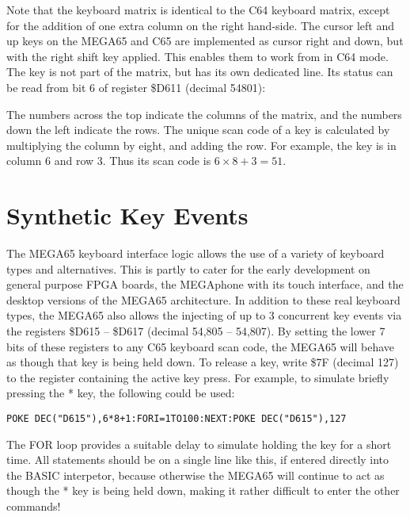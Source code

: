 Note that the keyboard matrix is identical to the C64 keyboard matrix, except for the addition of one extra column
on the right hand-side.  The cursor left and up keys on the MEGA65 and C65 are implemented as cursor right and down, but
with the right shift key applied.  This enables them to work from in C64 mode.  The  key is not
part of the matrix, but has its own dedicated line.  Its status can be read from bit 6 of register \$D611 (decimal 54801):

The numbers across the top indicate the columns of the matrix, and the numbers down the left indicate the rows.
The unique scan code of a key is calculated by multiplying the column by eight, and adding the row.  For example,
the  key is in column 6 and row 3. Thus its scan code is $6 \times 8 + 3 = 51$.

\section{Synthetic Key Events}

The MEGA65 keyboard interface logic allows the use of a variety of keyboard types and alternatives. This is partly
to cater for the early development on general purpose FPGA boards, the MEGAphone with its touch interface, and the
desktop versions of the MEGA65 architecture.  In addition to these real keyboard types, the MEGA65 also allows the
injecting of up to 3 concurrent key events via the registers \$D615 -- \$D617 (decimal 54,805 -- 54,807).  By setting the
lower 7 bits of these registers to any C65 keyboard scan code, the MEGA65 will behave as though that key is being
held down.  To release a key, write \$7F (decimal 127) to the register containing the active key press. For example,
to simulate briefly pressing the * key, the following could be used:

\begin{tcolorbox}[colback=black,coltext=white]
\verbatimfont{\codefont}
\begin{verbatim}
POKE DEC("D615"),6*8+1:FORI=1TO100:NEXT:POKE DEC("D615"),127
\end{verbatim}
\end{tcolorbox}

The FOR loop provides a suitable delay to simulate holding the key for a short time.  All statements should be on a single line
like this, if entered directly into the BASIC interpetor, because otherwise the MEGA65 will continue to act as though the * key
is being held down, making it rather difficult to enter the other commands!

